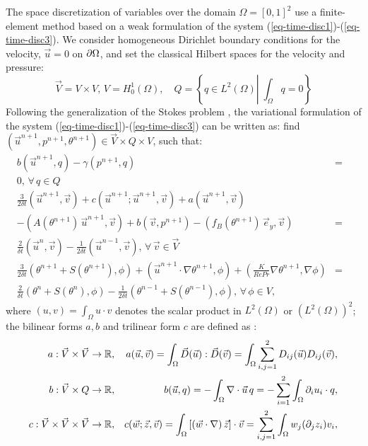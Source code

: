 The space discretization of variables over the domain $\Omega=[0,1]^2$ use a finite-element method based on a weak formulation of the system (\ref{eq-time-disc1})-(\ref{eq-time-disc3}). 
We consider homogeneous Dirichlet boundary conditions for the velocity, \ie $\vec{u}=0$ on $\partial \Omega$, and set the classical Hilbert spaces for the velocity and pressure:
\begin{equation}
\vec{V}=V\times V, \, V=H^1_0(\Omega), \quad Q=\left\{q\in L^2(\Omega)\left|\; \int_{\Omega}q=0\right.\right\}
\end{equation}
Following the generalization of the Stokes problem \citep{Temam,GRaviart,Quarteroni}, the variational formulation of the system  (\ref{eq-time-disc1})-(\ref{eq-time-disc3}) can be written as: find $(\vec{u}^{n+1}, p^{n+1}, \theta^{n+1}) \in \vec{V}\times Q\times V$, such that:
\begin{eqnarray}
\label{eq-weak-all}
b\left(\vec{u}^{n+1}, q\right) - \gamma (p^{n+1},q)&=& \\ \nonumber
0, \, \forall \, q \in Q \\ \nonumber
\frac{3}{2 \delta t} \left(\vec{u}^{n+1},\vec{v}\right) + c\left(\vec{u}^{n+1} ; \vec{u}^{n+1}, \vec{v} \right) +
{a\left(\vec{u}^{n+1}, \vec{v}\right)} & &\\ \nonumber
- (A(\theta^{n+1}) \, \vec u^{n+1},\vec v)+ b\left(\vec{v}, p^{n+1}\right)
- {\left(f_B(\theta^{n+1}) \, \vec{e}_y,\vec{v}\right)}
&=& \\ \nonumber
\frac{2}{\delta t} \left(\vec{u}^{n},\vec{v}\right) 
- \frac{1}{2 \delta t} \left(\vec{u}^{n-1},\vec{v}\right), \, \forall \, \vec{v} \in \vec{V}\\  \nonumber
\frac{3}{2 \delta t} \left(\theta^{n+1} + S(\theta^{n+1}), \phi\right)
+\left(\vec{u}^{n+1} \cdot \nabla \theta^{n+1} , \phi
\right) +
\left( \frac{K}{Re Pr} \nabla \theta^{n+1}, \nabla \phi \right) &=& \\  \nonumber
\frac{2}{\delta t} \left( \theta^{n}+S(\theta^n), \phi\right)
- \frac{1}{2 \delta t} \left( \theta^{n-1}+S(\theta^{n-1}), \phi\right),\, \forall \, \phi \in V,
\end{eqnarray}
where {$(u , v)=\int_{\Omega} u\cdot v$} denotes the scalar product in $L^2(\Omega)$ or $\left(L^2(\Omega)\right)^2$; the bilinear forms $a, b$ and trilinear form $c$ are defined as \cite{GRaviart,Quarteroni}:
\begingroup \small{
	\begin{eqnarray*}\nonumber
		a: \vec{V} \times \vec{V} \rightarrow {\mathbb R}, & & {a(\vec{u},\vec{v})= \int_{\Omega}  
			 \vec{D}(\vec{u}) : \vec{D}(\vec{v}) = \int_{\Omega}   \sum_{i,j=1}^2{D}_{ij}(\vec{u}) {D}_{ij}(\vec{v})},\\ 
		b: \vec{V} \times Q \rightarrow {\mathbb R}, & & b(\vec{u},q) = -\int_{\Omega}\nabla \cdot\vec{u}\, q =
		-\sum_{i=1}^2\int_{\Omega}\partial_i u_i\cdot q, \\ \nonumber
		c: \vec{V} \times \vec{V} \times \vec{V} \rightarrow {\mathbb R}, & & c(\vec{w}; \vec{z}, \vec{v})=\int_{\Omega} \left[\left(\vec{w} \cdot \nabla\right) \vec{z}\right] \cdot\vec{v}
		=\sum_{i,j=1}^2\int_{\Omega} w_j (\partial_j z_i) v_i,
		\label{eq-biforms}
	\end{eqnarray*}
}
